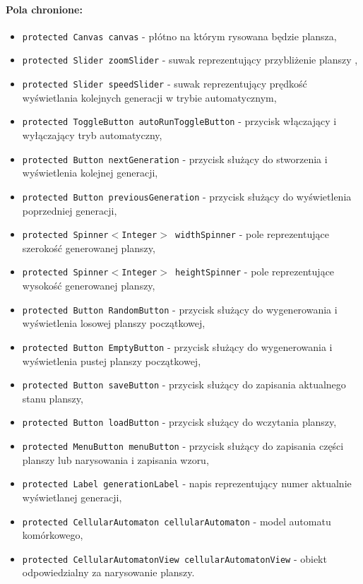 \documentclass{report}
\begin{document}
\paragraph{Pola chronione:}
\begin{itemize}
	\item \texttt{protected Canvas canvas} - płótno na którym rysowana będzie plansza,
	\item \texttt{protected Slider zoomSlider} - suwak reprezentujący przybliżenie planszy \label{sec:zoomSlider},
	\item \texttt{protected Slider speedSlider} - suwak reprezentujący prędkość wyświetlania kolejnych generacji w trybie automatycznym\label{sec:speedSlider},
	\item \texttt{protected ToggleButton autoRunToggleButton} - przycisk włączający i wyłączający tryb automatyczny,
	\item \texttt{protected Button nextGeneration} - przycisk służący do stworzenia i wyświetlenia kolejnej generacji,
	\item \texttt{protected Button previousGeneration}  - przycisk służący do  wyświetlenia poprzedniej generacji,
	\item \texttt{protected Spinner$<$Integer$>$  widthSpinner} - pole reprezentujące szerokość generowanej planszy,
	\item \texttt{protected Spinner$<$Integer$>$ heightSpinner} - pole reprezentujące wysokość generowanej planszy,
	\item \texttt{protected Button RandomButton} - przycisk służący do wygenerowania i wyświetlenia losowej planszy początkowej,
	\item \texttt{protected Button EmptyButton} - przycisk służący do wygenerowania i wyświetlenia pustej planszy początkowej,
	\item \texttt{protected Button saveButton} - przycisk służący do zapisania aktualnego stanu planszy,
	\item \texttt{protected Button loadButton} - przycisk służący do wczytania planszy,
	\item \texttt{protected MenuButton menuButton} - przycisk służący do zapisania części planszy lub narysowania i zapisania wzoru,
	\item \texttt{protected Label generationLabel} -  napis reprezentujący numer aktualnie wyświetlanej generacji,
	\item \texttt{protected CellularAutomaton cellularAutomaton} - model automatu komórkowego,
	\item \texttt{protected CellularAutomatonView cellularAutomatonView} - obiekt odpowiedzialny za narysowanie planszy.
\end{itemize}
\end{document}
